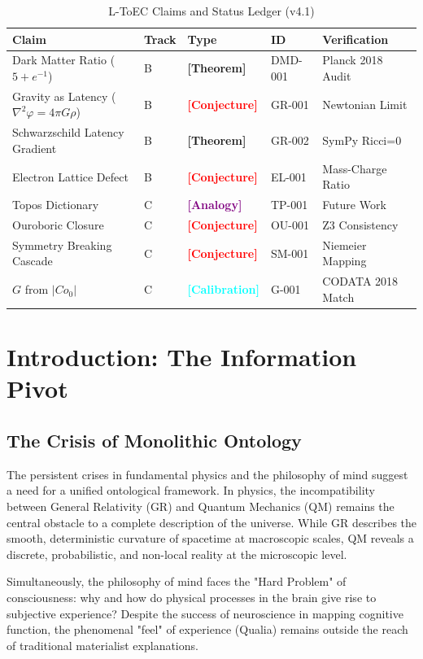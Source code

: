 \documentclass[11pt,titlepage]{article}
\newcommand{\tagtheo}{\textcolor{green!60!black}{\textbf{[Theorem]}} }
\newcommand{\tagconj}{\textcolor{red}{\textbf{[Conjecture]}} }
\newcommand{\taganal}{\textcolor{purple}{\textbf{[Analogy]}} }
\newcommand{\tagcal}{\textcolor{cyan}{\textbf{[Calibration]}} }
\begin{document}
\begin{table}[h!]
\centering
\begin{tabular}{@{}lllll@{}}
\toprule
\textbf{Claim} & \textbf{Track} & \textbf{Type} & \textbf{ID} & \textbf{Verification} \\ \midrule
Dark Matter Ratio ($5+e^{-1}$) & B & \tagtheo & DMD-001 & Planck 2018 Audit \\
Gravity as Latency ($\nabla^2 \varphi = 4\pi G \rho$) & B & \tagconj & GR-001 & Newtonian Limit \\
Schwarzschild Latency Gradient & B & \tagtheo & GR-002 & SymPy Ricci=0 \\
Electron Lattice Defect & B & \tagconj & EL-001 & Mass-Charge Ratio \\
Topos Dictionary & C & \taganal & TP-001 & Future Work \\
Ouroboric Closure & C & \tagconj & OU-001 & Z3 Consistency \\
Symmetry Breaking Cascade & C & \tagconj & SM-001 & Niemeier Mapping \\
$G$ from $|Co_0|$ & C & \tagcal & G-001 & CODATA 2018 Match \\ \bottomrule
\end{tabular}
\caption{L-ToEC Claims and Status Ledger (v4.1)}
\end{table}


\section{Introduction: The Information Pivot}

\subsection{The Crisis of Monolithic Ontology}
The persistent crises in fundamental physics and the philosophy of mind suggest a need for a unified ontological framework. In physics, the incompatibility between General Relativity (GR) and Quantum Mechanics (QM) remains the central obstacle to a complete description of the universe. While GR describes the smooth, deterministic curvature of spacetime at macroscopic scales, QM reveals a discrete, probabilistic, and non-local reality at the microscopic level.

Simultaneously, the philosophy of mind faces the "Hard Problem" of consciousness: why and how do physical processes in the brain give rise to subjective experience? Despite the success of neuroscience in mapping cognitive function, the phenomenal "feel" of experience (Qualia) remains outside the reach of traditional materialist explanations.
\end{document}
